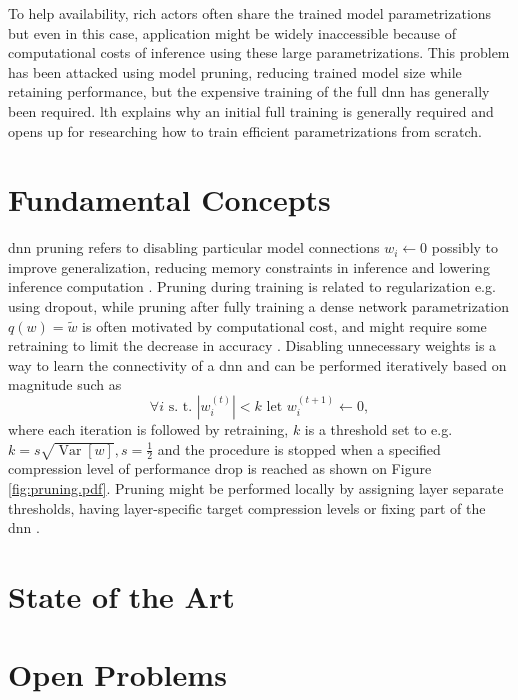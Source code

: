 \documentclass[12pt,fleqn,twocolumn]{article}
\newcommand{\half}{\ensuremath{\frac{1}{2}}}
\begin{document}
To help availability, rich actors often share the trained model parametrizations but even in this case, application might be widely inaccessible because of computational costs of inference using these large parametrizations.
This problem has been attacked using model pruning, reducing trained model size while retaining performance, but the expensive training of the full \acrshort{dnn} has generally been required.
\acrshort{lth} explains why an initial full training is generally required and opens up for researching how to train efficient parametrizations from scratch.

\section*{Fundamental Concepts}%
\acrshort{dnn} pruning refers to disabling particular model connections $w_i \leftarrow 0$ possibly to improve generalization, reducing memory constraints in inference and lowering inference computation \cite{han2015learning}.
Pruning during training is related to regularization e.g. using dropout, while pruning after fully training a dense network parametrization $q(w)=\tilde w$ is often motivated by computational cost, and might require some retraining to limit the decrease in accuracy \cite{lange2020lth}.
Disabling unnecessary weights is a way to learn the connectivity of a \acrshort{dnn} and can be performed iteratively based on magnitude such as 
\begin{equation}
    \forall i \text{ s. t. } |w_i^{(t)}|<k \text{ let } w_i^{(t+1)} \leftarrow 0,
\end{equation}
where each iteration is followed by retraining, $k$ is a threshold set to e.g. $k=s\sqrt{\operatorname{Var}[w]}, s=\half$ \cite{han2015learning, nzmora2019distiller} and the procedure is stopped when a specified compression level of performance drop is reached \cite{han2015learning} as shown on Figure \ref{fig:pruning.pdf}.
Pruning might be performed locally by assigning layer separate thresholds, having layer-specific target compression levels or fixing part of the \acrshort{dnn} \cite{han2015learning}.



\section*{State of the Art}%
\section*{Open Problems}%
\label{sec:Open Problems}

\clearpage
\renewcommand*{\bibfont}{\normalfont\footnotesize}
\printbibliography[heading=bibintoc]

\printglossary[type=\acronymtype]
\end{document}
